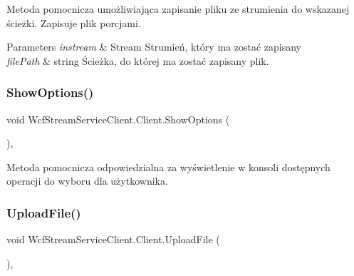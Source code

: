 Metoda pomocnicza umożliwiająca zapisanie pliku ze strumienia do wskazanej ścieżki. Zapisuje plik porcjami. 


\begin{DoxyParams}{Parameters}
{\em instream} & Stream Strumień, który ma zostać zapisany\\
\hline
{\em file\+Path} & string Ścieżka, do której ma zostać zapisany plik.\\
\hline
\end{DoxyParams}
\mbox{\label{class_wcf_stream_service_client_1_1_client_a448069d7619faa8b146c87a734fbb8a6}} 
\subsubsection{\texorpdfstring{Show\+Options()}{ShowOptions()}}
{\footnotesize\ttfamily void Wcf\+Stream\+Service\+Client.\+Client.\+Show\+Options (\begin{DoxyParamCaption}{ }\end{DoxyParamCaption})\hspace{0.3cm}{\ttfamily [inline]}, {\ttfamily [private]}}



Metoda pomocnicza odpowiedzialna za wyświetlenie w konsoli dostępnych operacji do wyboru dla użytkownika. 

\mbox{\label{class_wcf_stream_service_client_1_1_client_a2262b00b6486bc8db00049dc0d156895}} 
\subsubsection{\texorpdfstring{Upload\+File()}{UploadFile()}}
{\footnotesize\ttfamily void Wcf\+Stream\+Service\+Client.\+Client.\+Upload\+File (\begin{DoxyParamCaption}{ }\end{DoxyParamCaption})\hspace{0.3cm}{\ttfamily [inline]}, {\ttfamily [private]}}



